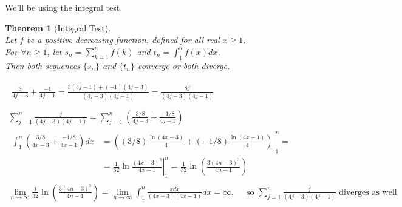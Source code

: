 \documentclass[twoside]{amsart}
\theoremstyle{plain}
\newtheorem{theorem}{Theorem}
\theoremstyle{definition}
\newcommand{\exercisehead}[1]
  {\smallskip
   \noindent{\small\bf Exercise #1.}}
\begin{document}
We'll be using the integral test.  

\begin{theorem}[Integral Test] \quad \\
Let $f$ be a positive decreasing function, defined for all real $x \geq 1$.  \\
For $\forall n \geq 1$, let $s_n = \sum_{k=1}^n f(k)$ and $t_n = \int_1^n f(x) dx$.  \\
Then both sequences  $\{ s_n \}$ and $\{ t_n \}$ converge or both diverge.  
\end{theorem}

\exercisehead{1} 
\[
\begin{gathered} 
\begin{gathered}
  \frac{3}{4j-3} + \frac{-1}{4j-1} = \frac{ 3(4j-1) + (-1)(4j-3) }{ (4j-3)(4j-1) } = \frac{ 8j}{ (4j-3)(4j-1) } \\  
\end{gathered} \\
\sum_{j=1}^n \frac{j}{ (4j-3)(4j-1) } = \sum_{j=1}^n \left( \frac{ 3/8}{ 4j -3} + \frac{ -1/8}{ 4j-1} \right) \\
\begin{aligned}
  \int_1^n \left( \frac{ 3/8}{ 4x-3} + \frac{ -1/8}{4x-1} \right) dx & = \left. \left( (3/8) \frac{ \ln{ (4x -3 ) }}{ 4} + (-1/8) \frac{ \ln{(4x -1) }  }{ 4 } \right) \right|_1^n = \\
  & = \frac{1}{32} \left. \ln{ \frac{ (4x-3)^3}{ 4x-1}  } \right|_1^n = \frac{1}{32} \ln{ \left( \frac{3 (4n-3)^3 }{ 4n -1 } \right) } 
\end{aligned} \\
\lim_{n \to \infty} \frac{1}{32} \ln{ \left( \frac{3 (4n-3)^3 }{ 4n - 1 } \right) } = \lim_{n\to \infty} \int_1^n \frac{ x dx }{ (4x-3)(4x-1) } dx = \infty, \quad \text{ so  $\sum_{j=1}^n \frac{j}{ (4j-3)(4j-1) } $ diverges as well }
\end{gathered}
\]
\end{document}
